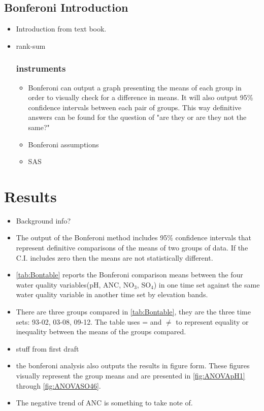 \subsection{Bonferoni Introduction}
\begin{itemize}
    \item Introduction from text book.
    \item rank-sum
    \subsubsection{instruments}
    \begin{itemize}
        \item Bonferoni can output a graph presenting the means of each group in order to visually check for a difference in means. It will also output 95\%
        confidence intervals between each pair of groups.  This way definitive answers can be found for the question of "are they or are they not the same?"
        \item Bonferoni assumptions
        \item SAS
    \end{itemize}
\end{itemize}
\section{Results}
\begin{itemize}
	\item Background info?
	\item The output of the Bonferoni method includes 95\% confidence intervals that represent definitive comparisons of the means of two groups of data.  If the C.I. includes zero then the means are not statistically different.
	\item \autoref{tab:Bontable} reports the Bonferoni comparison means between the four water quality variables(pH, ANC, NO$_3$, SO$_4$) in one time set against the same water quality variable in another time set by elevation bands.
	\item There are three groups compared in \autoref{tab:Bontable}, they are the three time sets: 93-02, 03-08, 09-12.  The table uses = and $\neq$ to represent equality or inequality between the means of the groups compared.
	\item stuff from first draft
	\item the bonferoni analysis also outputs the results in figure form.  These figures visually represent the group means and are presented in \autoref{fig:ANOVApH1} through \autoref{fig:ANOVASO46}.%
	\item The negative trend of ANC is something to take note of.
\end{itemize}
